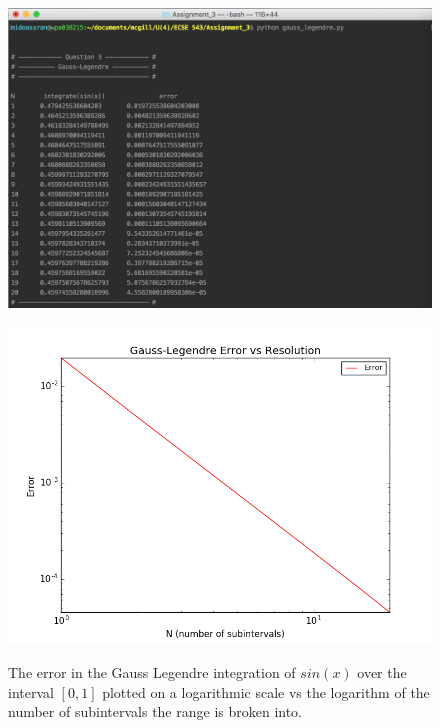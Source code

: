 \documentclass[11pt]{article}
\begin{document}
\begin{figure}[!hbp]
	\begin{center}
		\begin{minipage}{ 0.7\textwidth}
			\includegraphics[width= \textwidth]{o_GL_sin.png}\\
		\end{minipage}
		\begin{minipage}{ \textwidth}
			\includegraphics[width=\textwidth]{GL_sin.png}\\
		\end{minipage}
		\caption{\label{fig:GL_sin}The error in the Gauss Legendre integration of $sin(x)$ over the interval $[0,1]$ plotted on a logarithmic scale vs the logarithm of the number of subintervals the range is broken into.}
	\end{center}
\end{figure}
\end{document}
